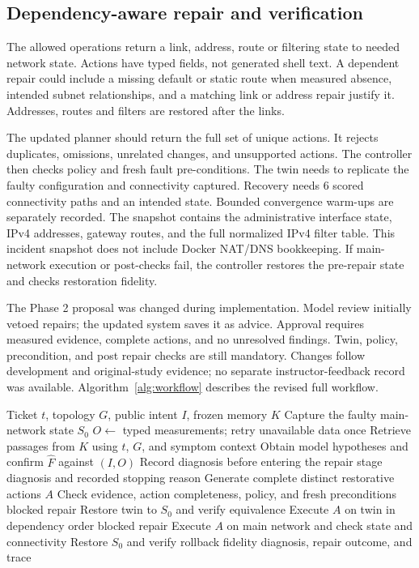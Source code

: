 \documentclass[pdflatex,sn-mathphys-num,iicol]{sn-jnl}
\begin{document}
\subsection{Dependency-aware repair and verification}
The allowed operations return a link, address, route or filtering state to needed network state. Actions have typed fields, not generated shell text. A dependent repair could include a missing default or static route when measured absence, intended subnet relationships, and a matching link or address repair justify it. Addresses, routes and filters are restored after the links.

The updated planner should return the full set of unique actions. It rejects duplicates, omissions, unrelated changes, and unsupported actions. The controller then checks policy and fresh fault pre-conditions. The twin needs to replicate the faulty configuration and connectivity captured. Recovery needs 6 scored connectivity paths and an intended state. Bounded convergence warm-ups are separately recorded. The snapshot contains the administrative interface state, IPv4 addresses, gateway routes, and the full normalized IPv4 filter table. This incident snapshot does not include Docker NAT/DNS bookkeeping. If main-network execution or post-checks fail, the controller restores the pre-repair state and checks restoration fidelity.

The Phase 2 proposal was changed during implementation. Model review initially vetoed repairs; the updated system saves it as advice. Approval requires measured evidence, complete actions, and no unresolved findings. Twin, policy, precondition, and post repair checks are still mandatory. Changes follow development and original-study evidence; no separate instructor-feedback record was available. Algorithm~\ref{alg:workflow} describes the revised full workflow.

\begin{algorithm}[t]
\caption{Revised evidence-linked diagnosis and repair}\label{alg:workflow}
\begin{algorithmic}[1]
\Require Ticket $t$, topology $G$, public intent $I$, frozen memory $K$
\State Capture the faulty main-network state $S_0$
\State $O\gets$ typed measurements; retry unavailable data once
\State Retrieve passages from $K$ using $t$, $G$, and symptom context
\State Obtain model hypotheses and confirm $\widehat F$ against $(I,O)$
\State Record diagnosis before entering the repair stage
\State \Return diagnosis and recorded stopping reason
\EndIf
\State Generate complete distinct restorative actions $A$
\State Check evidence, action completeness, policy, and fresh preconditions
 \State \Return blocked repair \EndIf
\State Restore twin to $S_0$ and verify equivalence
\State Execute $A$ on twin in dependency order
 \State \Return blocked repair \EndIf
\State Execute $A$ on main network and check state and connectivity
\State Restore $S_0$ and verify rollback fidelity
\EndIf
\State \Return diagnosis, repair outcome, and trace
\end{algorithmic}
\end{algorithm}
\end{document}
